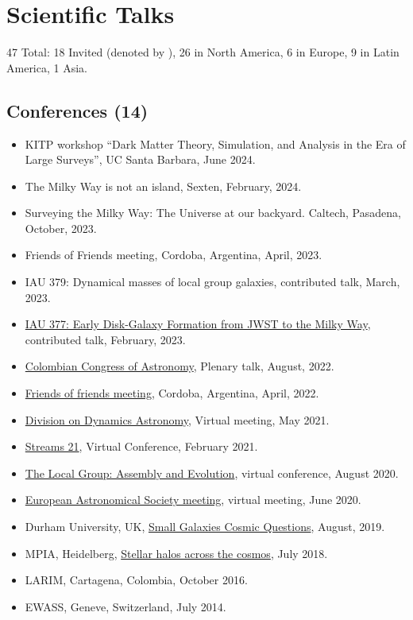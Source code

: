 \documentclass[14pt]{article}
\begin{document}
\section*{Scientific Talks}

47 Total: 18 Invited (denoted by \dag), 26 in North America, 6 in Europe, 9 in Latin America, 1 Asia.\\


\subsection*{Conferences (14)}

\begin{itemize}
  \setlength\itemsep{0.0em}
  \renewcommand\labelitemi{$\cdot$}
  \item KITP workshop ``Dark Matter Theory, Simulation, and Analysis in the Era of Large Surveys'', UC Santa Barbara, June 2024. \dag
  \item The Milky Way is not an island, Sexten, February, 2024. 
\item Surveying the Milky Way: The Universe at our backyard. Caltech,
  Pasadena, October, 2023.
\item Friends of Friends meeting, Cordoba, Argentina, April, 2023. \dag
\item IAU 379: Dynamical masses of local group galaxies, contributed talk, March, 2023.
\item \href{https://www.mso.anu.edu.au/~yting/Malaysia_IAU/}{IAU 377: Early Disk-Galaxy Formation
from JWST to the Milky Way}, contributed talk, February, 2023.
\item \href{https://accefyn.com/microsites/nodos/astroco/congreso-colombiano-de-astronomia-cocoa-2022%E2%80%8B/}{Colombian Congress of Astronomy}, Plenary talk, August, 2022. \dag
\item \href{http://fof.oac.uncor.edu/2022/}{Friends of friends meeting}, Cordoba, Argentina, April, 2022.
\item \href{https://aas.org/meetings/dda52}{Division on Dynamics Astronomy}, Virtual meeting, May 2021.
\item \href{https://stellarstreams.org/streams21/}{Streams 21}, Virtual
  Conference, February 2021. 
\item  \href{https://www.stsci.edu/contents/events/stsci/2020/april/the-local-group-assembly-and-evolution?page=2&filterUUID=6fedb8a7-}{The Local Group: Assembly and Evolution}, virtual conference, August 2020.
\item \href{https://eas.unige.ch/EAS2020/}{European Astronomical Society meeting}, virtual meeting, June 2020.
\item Durham University, UK, \href{http://astro.dur.ac.uk/cosmodwarfs/}{Small Galaxies Cosmic Questions}, August, 2019.
\item MPIA, Heidelberg, \href{http://www.mpia.de/homes/stellarhalos2018-loc/sh2018/index.html}{Stellar halos across the cosmos}, July 2018.
\item LARIM, Cartagena, Colombia, October 2016.
\item EWASS, Geneve, Switzerland, July 2014.
\end{itemize}
  
\end{document}
